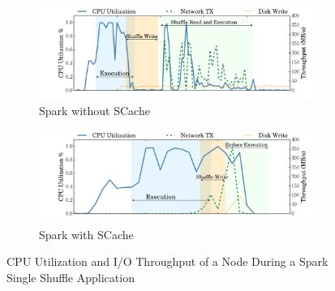 \begin{figure}
	\begin{subfigure}{\linewidth}
		\includegraphics[width=\linewidth]{fig/util}
		\caption{Spark without SCache}
		\label{fig:util}
	\end{subfigure}
	\begin{subfigure}{\linewidth}
		\includegraphics[width=\linewidth]{fig/scache_util}
		\caption{Spark with SCache}
		\label{fig:scache_util}
	\end{subfigure}
	\caption{CPU Utilization and I/O Throughput of a Node During a Spark Single Shuffle Application}
	\label{fig:simple_spark}
\end{figure}

